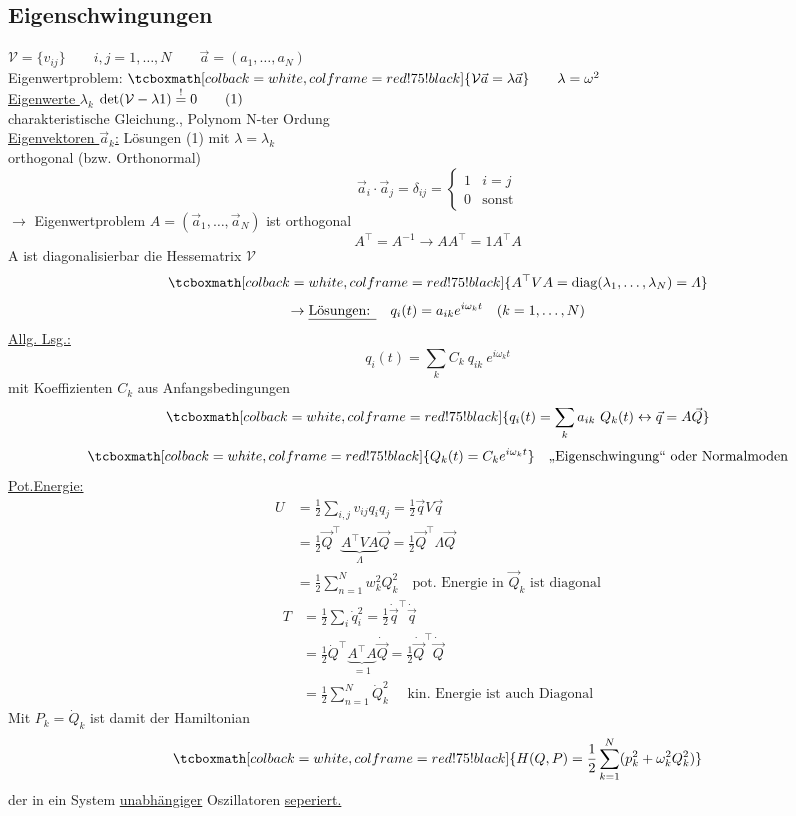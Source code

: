\documentclass[titlepage,12pt,a4paper,ngerman]{report}
\newcommand{\tx}[1]{\textrm{#1}}
\newcommand{\ub}[1]{\underbrace{#1}}
\newcommand{\rmbox}[1]{\tcboxmath[colback=white,colframe=red!75!black]{#1}} %
\renewcommand{\boxed}{\rmbox}
\begin{document}
{\subsection{Eigenschwingungen}
$\mathcal{V} = \{v_{ij}\} \qquad i,j = 1, \dots ,N \qquad \vec{a} = (a_1,\dots,a_N)$\\
Eigenwertproblem: $ \boxed{\mathcal{V} \vec{a} = \lambda \vec{a}}  \qquad \lambda = \omega^2$\\
\underline{Eigenwerte $ \lambda_k $} $\det(\mathcal{V}-\lambda1) \buildrel ! \over = 0 \qquad (1)$\\
charakteristische Gleichung., Polynom N-ter Ordung\\
\underline{Eigenvektoren $ \vec{a}_k $:} Lösungen (1) mit $ \lambda = \lambda_k  $\\
orthogonal (bzw. Orthonormal)\\
$$\vec{a}_i \cdot \vec{a}_j = \delta_{ij} = \left\{ \begin{array}{ll}
1 & i=j \\
0 & \tx{sonst}
\end{array}\right.$$
$\rightarrow$ Eigenwertproblem $A = (\vec{a}_{1},\dots , \vec{a}_{N})$ ist orthogonal
$$A^\top = A^{-1} \rightarrow A A^\top = 1 A^\top A$$
A ist diagonalisierbar die Hessematrix $ \mathcal{V} $
$$\boxed{A^{\top}V A = \tx{diag}(\lambda_1,\dots, \lambda_N) = \varLambda}$$
$$\rightarrow \tx{\underline{Lösungen: }} \quad   q_i(t) = a_{ik} e ^{i \omega_k t} \quad (k=1,\dots,N)$$
\underline{Allg. Lsg.:} $$q_i(t) = \sum_k C_k \ q_{ik} \ e^{i\omega_k t}$$
mit Koeffizienten $C_k$ aus Anfangsbedingungen
$$\boxed{q_i(t) = \sum_k a_{ik} \ Q_k(t) \leftrightarrow \vec{q} = A \vec{Q}}$$
$$\boxed{Q_{k}(t) = C_k e^{i\omega_k t}} \quad \tx{,,Eigenschwingung`` oder Normalmoden}$$
\underline{Pot.Energie:}
\begin{align*}
U &= \frac{1}{2} \sum_{i,j} v_{ij} q_i q_j = \frac{1}{2} \vec{q} V \vec{q}\\
&= \frac{1}{2} \vec{Q}^\top \ub{ A^\top V A}_{\varLambda} \vec{Q} = \frac{1}{2} \vec{Q}^\top \varLambda \vec{Q}\\
&= \frac{1}{2} \sum_{n=1}^{N} w_k^2 Q_k^2 \quad \tx{pot. Energie in } \vec{Q}_k \tx{ ist diagonal}
\end{align*}
\begin{align*}
T &= \frac{1}{2} \sum_i \dot{q}_i^2 = \frac{1}{2} \dot{\vec{q}}^\top \dot{\vec{q}} \\
&= \frac{1}{2} \dot{Q}^\top \ub{ A^\top A }_{= 1} \dot{\vec{Q}} = \frac{1}{2} \dot{\vec{Q}}^\top \dot{\vec{Q}}\\
&= \frac{1}{2} \sum_{n=1}^{N} \dot{Q}_k^2 \quad \tx{ kin. Energie ist auch Diagonal}
\end{align*}
Mit $P_k = \dot{Q}_k$ ist damit der Hamiltonian
$$\boxed{H(Q,P) = \frac{1}{2} \sum_{k=1}^{N} ( p^2_k + \omega_k^2 Q^2_k)}$$
der in ein System \underline{unabhängiger} Oszillatoren \underline{seperiert.}
}
\end{document}
